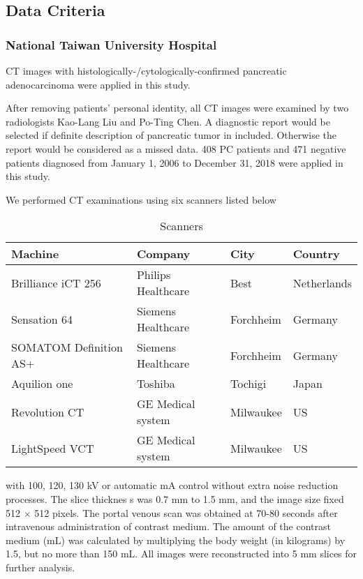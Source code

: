 \subsection{Data Criteria}
\subsubsection{National Taiwan University Hospital}
CT images with histologically-/cytologically-confirmed pancreatic adenocarcinoma were applied in this study.

After removing patients’ personal identity, all CT images were examined by two radiologists Kao-Lang Liu and Po-Ting Chen. A diagnostic report would be selected if definite description of pancreatic tumor in included. Otherwise the report would be considered as a missed data. 408 PC patients and 471 negative patients diagnosed from January 1, 2006 to December 31, 2018 were applied in this study.

We performed CT examinations using six scanners listed below
\begin{table}[H]
\centering 
\caption{Scanners}

\begin{tabular}{|l|l|l|l|} 
\hline
Machine  & Company & City & Country  \\ 
\hline
Brilliance iCT 256 & Philips Healthcare & Best & Netherlands           \\ 
\hline
Sensation 64 & Siemens Healthcare & Forchheim & Germany              \\ 
\hline
SOMATOM Definition AS+ & Siemens Healthcare & Forchheim & Germany               \\ 
\hline
Aquilion one & Toshiba & Tochigi & Japan              \\
\hline
Revolution CT &  GE Medical system & Milwaukee & US              \\
\hline
LightSpeed VCT & GE Medical system & Milwaukee & US              \\
\hline
\end{tabular}
\end{table}

with 100, 120, 130 kV or automatic mA control without extra noise reduction processes. The slice thicknes s was 0.7 mm to 1.5 mm, and the image size fixed 512 $ \times $ 512 pixels. The portal venous scan was obtained at 70-80 seconds after intravenous administration of contrast medium. The amount of the contrast medium (mL) was calculated by multiplying the body weight (in kilograms) by 1.5, but no more than 150 mL. All images were reconstructed into 5 mm slices for further analysis. \cite{liu2020deep}

